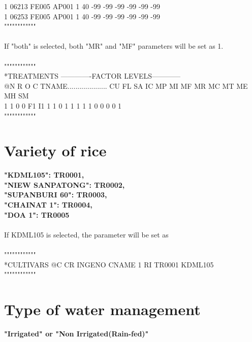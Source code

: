 \documentclass[11pt,a4j]{jarticle}
\begin{document}
 1 06213 FE005 AP001     1    40   -99   -99   -99   -99   -99 -99\\
 1 06253 FE005 AP001     1    40   -99   -99   -99   -99   -99 -99\\
 """"""""""""\\
\\
If "both" is selected, both "MR" and "MF" parameters will be set as 1.\\
\\
""""""""""""\\
*TREATMENTS                        -------------FACTOR LEVELS------------\\
@N R O C TNAME.................... CU FL SA IC MP MI MF MR MC MT ME MH SM\\
 1 1 0 0 F1 I1                      1  1  0  1  1  1  1  1  0  0  0  0  1\\
 """"""""""""\\

  \section{Variety of rice}
  
{\bf "KDML105": TR0001,\\
"NIEW SANPATONG": TR0002, \\
"SUPANBURI 60": TR0003,\\
"CHAINAT 1": TR0004,\\
"DOA 1": TR0005}\\
\\
If KDML105 is selected, the parameter will be set as\\
\\
""""""""""""\\
*CULTIVARS
@C CR INGENO CNAME
 1 RI TR0001 KDML105\\
""""""""""""\\ 
 
  \section{Type of water management}
  
{\bf "Irrigated" or "Non Irrigated(Rain-fed)"}\\
\end{document}
